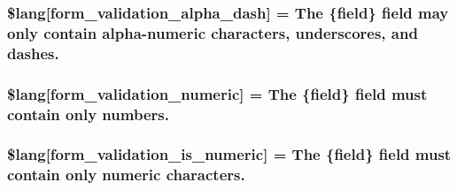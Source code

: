 \subsubsection[{\$lang}]{\setlength{\rightskip}{0pt plus 5cm}\$lang\mbox{[}\textquotesingle{}form\+\_\+validation\+\_\+alpha\+\_\+dash\textquotesingle{}\mbox{]} = \textquotesingle{}The \{field\} field may only contain alpha-\/numeric characters, underscores, and dashes.\textquotesingle{}}\label{system_2language_2english_2form__validation__lang_8php_a95a401451435c56b9792be96ffa1bb36}
\hypertarget{system_2language_2english_2form__validation__lang_8php_abfd87d5b6c986ce3d4c0498ade54b380}{}
\subsubsection[{\$lang}]{\setlength{\rightskip}{0pt plus 5cm}\$lang\mbox{[}\textquotesingle{}form\+\_\+validation\+\_\+numeric\textquotesingle{}\mbox{]} = \textquotesingle{}The \{field\} field must contain only numbers.\textquotesingle{}}\label{system_2language_2english_2form__validation__lang_8php_abfd87d5b6c986ce3d4c0498ade54b380}
\hypertarget{system_2language_2english_2form__validation__lang_8php_a520425fb2cba1854c9df71d98f5645c3}{}
\subsubsection[{\$lang}]{\setlength{\rightskip}{0pt plus 5cm}\$lang\mbox{[}\textquotesingle{}form\+\_\+validation\+\_\+is\+\_\+numeric\textquotesingle{}\mbox{]} = \textquotesingle{}The \{field\} field must contain only numeric characters.\textquotesingle{}}\label{system_2language_2english_2form__validation__lang_8php_a520425fb2cba1854c9df71d98f5645c3}
\hypertarget{system_2language_2english_2form__validation__lang_8php_a4253ed0257e1c783da5b45a932b473ba}{}
